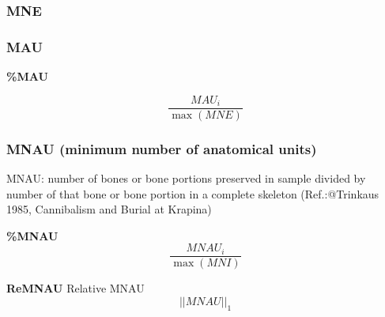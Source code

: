 \documentclass[
  letterpaper,
  DIV=11,
  numbers=noendperiod]{scrartcl}
\begin{document}
\hypertarget{mne}{%
\subsubsection{MNE}\label{mne}}

\hypertarget{mau}{%
\subsubsection{MAU}\label{mau}}

\textbf{\%MAU}

\[\frac{MAU_i}{\max(MNE)}\]

\hypertarget{mnau-minimum-number-of-anatomical-units}{%
\subsubsection{MNAU (minimum number of anatomical
units)}\label{mnau-minimum-number-of-anatomical-units}}

MNAU: number of bones or bone portions preserved in sample divided by
number of that bone or bone portion in a complete skeleton
(Ref.:@Trinkaus 1985, Cannibalism and Burial at Krapina)

\textbf{\%MNAU} \[\frac{MNAU_i}{\max(MNI)}\]

\textbf{ReMNAU} Relative MNAU \[||MNAU||_1 \]
\end{document}
